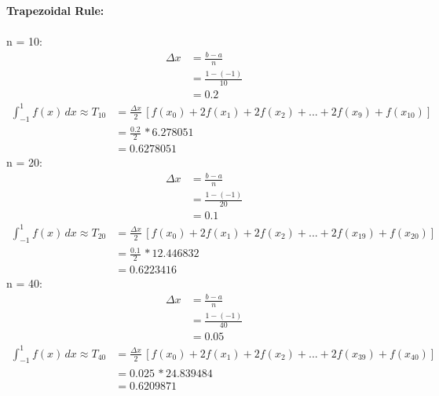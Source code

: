 \documentclass{article}
\begin{document}
    \textbf{Trapezoidal Rule:} \\\\
    n = 10:\\
    \begin{align*}
        \Delta x &= \frac{b-a}{n}\\
        &= \frac{1-(-1)}{10}\\
        &= 0.2
    \end{align*}
    \begin{align*}
        \int_{-1}^{1} f(x) \, dx \approx T_{10} &= \frac{\Delta x}{2}\,[f(x_0)+2f(x_1)+2f(x_2)+...+2f(x_{9})+f(x_{10})] \\
        &=\frac{0.2}{2} \, * 6.278051 \\
        &=0.6278051
    \end{align*}
    n = 20:\\
    \begin{align*}
        \Delta x &= \frac{b-a}{n}\\
        &= \frac{1-(-1)}{20}\\
        &= 0.1
    \end{align*}
    \begin{align*}
        \int_{-1}^{1} f(x) \, dx \approx T_{20} &= \frac{\Delta x}{2}\,[f(x_0)+2f(x_1)+2f(x_2)+...+2f(x_{19})+f(x_{20})] \\
        &=\frac{0.1}{2} \, * 12.446832 \\
        &=0.6223416
    \end{align*}
    n = 40:\\
    \begin{align*}
        \Delta x &= \frac{b-a}{n}\\
        &= \frac{1-(-1)}{40}\\
        &= 0.05
    \end{align*}
    \begin{align*}
        \int_{-1}^{1} f(x) \, dx \approx T_{40} &= \frac{\Delta x}{2}\,[f(x_0)+2f(x_1)+2f(x_2)+...+2f(x_{39})+f(x_{40})] \\
        &=0.025 \, * 24.839484\\
        &=0.6209871
    \end{align*} \\\\
\end{document}
